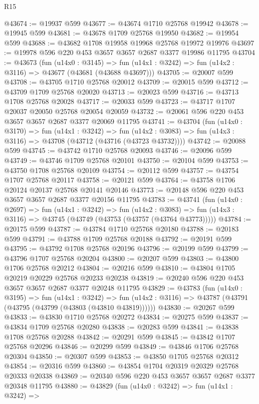 \begin{lexlean}{R15}
\begin{coremodule}
@43674 := @19937 @599
@43677 := @43674 @1710 @25768 @19942
@43678 := @19945 @599
@43681 := @43678 @1709 @25768 @19950
@43682 := @19954 @599
@43688 := @43682 @1708 @19958 @19968 @25768 @19972 @19976
@43697 := @19978 @596 @220 @453 @3657 @3657 @2687 @3377 @19986 @11795
@43704 := @43673
    (fun (u14x0 : @3145) =>
    fun (u14x1 : @3242) => fun (u14x2 : @3116) => @43677 (@43681 (@43688 @43697)))
@43705 := @20007 @599
@43708 := @43705 @1710 @25768 @20012
@43709 := @20015 @599
@43712 := @43709 @1709 @25768 @20020
@43713 := @20023 @599
@43716 := @43713 @1708 @25768 @20028
@43717 := @20033 @599
@43723 := @43717 @1707 @20037 @20050 @25768 @20054 @20059
@43732 := @20061 @596 @220 @453 @3657 @3657 @2687 @3377 @20069 @11795
@43741 := @43704
    (fun (u14x0 : @3170) =>
    fun (u14x1 : @3242) =>
    fun (u14x2 : @3083) => fun (u14x3 : @3116) => @43708 (@43712 (@43716 (@43723 @43732))))
@43742 := @20088 @599
@43745 := @43742 @1710 @25768 @20093
@43746 := @20096 @599
@43749 := @43746 @1709 @25768 @20101
@43750 := @20104 @599
@43753 := @43750 @1708 @25768 @20109
@43754 := @20112 @599
@43757 := @43754 @1707 @25768 @20117
@43758 := @20121 @599
@43764 := @43758 @1706 @20124 @20137 @25768 @20141 @20146
@43773 := @20148 @596 @220 @453 @3657 @3657 @2687 @3377 @20156 @11795
@43783 := @43741
    (fun (u14x0 : @2697) =>
    fun (u14x1 : @3242) =>
    fun (u14x2 : @3083) => fun (u14x3 : @3116) => @43745 (@43749 (@43753 (@43757 (@43764 @43773)))))
@43784 := @20175 @599
@43787 := @43784 @1710 @25768 @20180
@43788 := @20183 @599
@43791 := @43788 @1709 @25768 @20188
@43792 := @20191 @599
@43795 := @43792 @1708 @25768 @20196
@43796 := @20199 @599
@43799 := @43796 @1707 @25768 @20204
@43800 := @20207 @599
@43803 := @43800 @1706 @25768 @20212
@43804 := @20216 @599
@43810 := @43804 @1705 @20219 @20229 @25768 @20233 @20238
@43819 := @20240 @596 @220 @453 @3657 @3657 @2687 @3377 @20248 @11795
@43829 := @43783
    (fun (u14x0 : @3195) =>
    fun (u14x1 : @3242) =>
    fun (u14x2 : @3116) => @43787 (@43791 (@43795 (@43799 (@43803 (@43810 @43819))))))
@43830 := @20267 @599
@43833 := @43830 @1710 @25768 @20272
@43834 := @20275 @599
@43837 := @43834 @1709 @25768 @20280
@43838 := @20283 @599
@43841 := @43838 @1708 @25768 @20288
@43842 := @20291 @599
@43845 := @43842 @1707 @25768 @20296
@43846 := @20299 @599
@43849 := @43846 @1706 @25768 @20304
@43850 := @20307 @599
@43853 := @43850 @1705 @25768 @20312
@43854 := @20316 @599
@43860 := @43854 @1704 @20319 @20329 @25768 @20333 @20338
@43869 := @20340 @596 @220 @453 @3657 @3657 @2687 @3377 @20348 @11795
@43880 := @43829
    (fun (u14x0 : @3242) =>
    fun (u14x1 : @3242) =>

\end{coremodule}
\end{lexlean}
